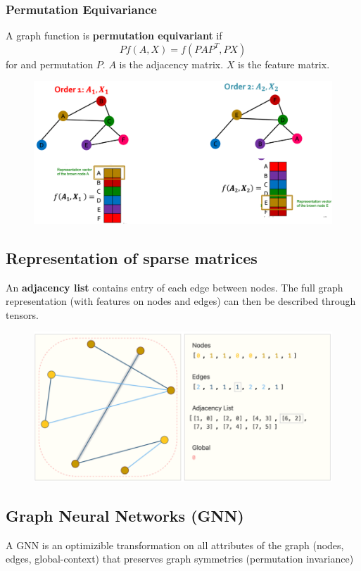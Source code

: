 \subsubsection*{Permutation Equivariance}
A graph function is \textbf{permutation equivariant} if
\[
Pf(A,X) = f(PAP^T,PX)
\]
for and permutation \(P\).
\(A\) is the adjacency matrix.
\(X\) is the feature matrix.
\begin{figure}[!h]
    \includegraphics[width = \columnwidth]{figures/GraphNeuralNetworks1/PermutationEquivariance.png}
\end{figure}

\subsection{Representation of sparse matrices}
An \textbf{adjacency list} contains entry of each edge between nodes.
The full graph representation (with features on nodes and edges) can then be described through tensors.
\begin{figure}[!h]
    \includegraphics[width = \columnwidth]{figures/GraphNeuralNetworks1/SparseMatrices.png}
\end{figure}

\subsection{Graph Neural Networks (GNN)}
A GNN is an optimizible transformation on all attributes of the graph (nodes, edges, global-context) that preserves graph symmetries (permutation invariance)

